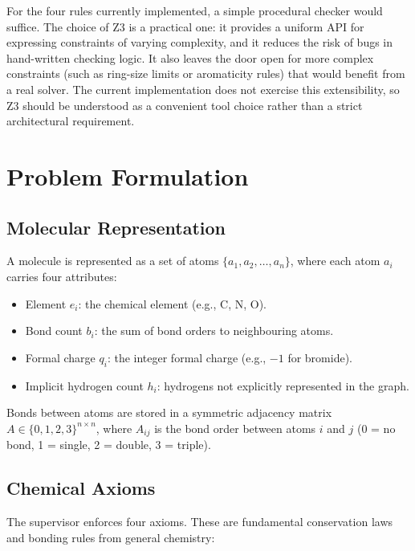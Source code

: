 \documentclass[11pt]{article}
\begin{document}
For the four rules currently implemented, a simple procedural checker
would suffice. The choice of Z3 is a practical one: it provides a
uniform API for expressing constraints of varying complexity, and it
reduces the risk of bugs in hand-written checking logic. It also leaves
the door open for more complex constraints (such as ring-size limits or
aromaticity rules) that would benefit from a real solver. The current
implementation does not exercise this extensibility, so Z3 should be
understood as a convenient tool choice rather than a strict architectural
requirement.

\section{Problem Formulation}

\subsection{Molecular Representation}

A molecule is represented as a set of atoms
$\{a_1, a_2, \ldots, a_n\}$, where each atom $a_i$ carries four
attributes:

\begin{itemize}[nosep]
  \item Element $e_i$: the chemical element (e.g., C, N, O).
  \item Bond count $b_i$: the sum of bond orders to neighbouring atoms.
  \item Formal charge $q_i$: the integer formal charge
        (e.g., $-1$ for bromide).
  \item Implicit hydrogen count $h_i$: hydrogens not explicitly
        represented in the graph.
\end{itemize}

Bonds between atoms are stored in a symmetric adjacency matrix
$A \in \{0,1,2,3\}^{n \times n}$, where $A_{ij}$ is the bond order
between atoms $i$ and $j$ (0 = no bond, 1 = single, 2 = double,
3 = triple).

\subsection{Chemical Axioms}

The supervisor enforces four axioms. These are fundamental conservation
laws and bonding rules from general chemistry:
\end{document}
